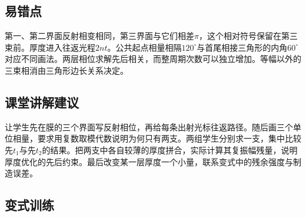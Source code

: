\documentclass[UTF8,fontset=fandol,a4paper,11pt]{ctexart}
\begin{document}


\subsection*{易错点}

第一、第二界面反射相变相同，第三界面与它们相差$\pi$，这个相对符号保留在第三束前。厚度进入往返光程$2nt$。公共起点相量相隔$120^\circ$与首尾相接三角形的内角$60^\circ$对应不同画法。两层相位求解先后相关，而整周期次数可以独立增加。等幅以外的三束相消由三角形边长关系决定。



\subsection*{课堂讲解建议}

让学生先在膜的三个界面写反射相位，再给每条出射光标往返路径。随后画三个单位相量，要求用复数取模代数说明为何只有两支。两组学生分别求一支，集中比较先$t_1$与先$t_2$的结果。把两支中各自较薄的厚度拼合，实际计算其复振幅残量，说明厚度优化的先后约束。最后改变某一层厚度一个小量，联系变式中的残余强度与制造误差。



\subsection*{变式训练}
\end{document}
